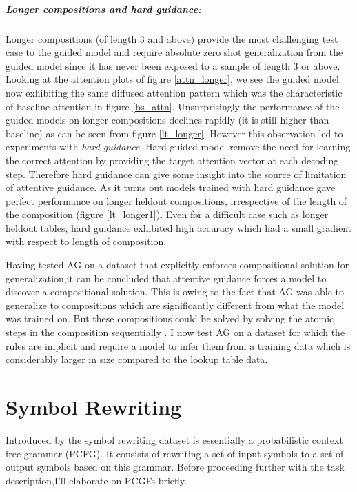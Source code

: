 \subparagraph{Longer compositions and hard guidance:} Longer compositions (of length 3 and above) provide the most challenging test case to the guided model and require absolute zero shot generalization from the guided model since it has never been exposed to a sample of length 3 or above. Looking at the attention plots of figure \ref{attn_longer}, we see the guided model now exhibiting the same diffused attention pattern which was the characteristic of baseline attention in figure \ref{bs_attn}. Unsurprisingly the performance of the guided models on longer compositions declines rapidly (it is still higher than baseline) as can be seen from figure \ref{lt_longer}.
However this observation led to experiments with \textit{hard guidance}. Hard guided model remove the need for learning the correct attention by providing the target attention vector at each decoding step. Therefore hard guidance can give some insight into the source of limitation of attentive guidance. As it turns out models trained with hard guidance gave perfect performance on longer heldout compositions, irrespective of the length of the composition (figure \ref{lt_longer1}). Even for a difficult case such as longer heldout tables, hard guidance exhibited high accuracy which had a small gradient with respect to length of composition.

Having tested AG on a dataset that explicitly enforces compositional solution for generalization,it can be concluded that attentive guidance forces a model to discover a compositional solution. This is owing to the fact that AG was able to generalize to compositions which are significantly different from what the model was trained on. But these compositions could be solved by solving the atomic steps in the composition sequentially . I now test AG on a dataset for which the rules are implicit and require a model to infer them from a training data which is considerably larger in size compared to the lookup table data. 



\section{Symbol Rewriting} \label{datasets:sr}
Introduced by \cite{Weber2018} the symbol rewriting dataset is essentially a probabilistic context free grammar (PCFG). It consists of rewriting a set of input symbols to a set of output symbols based on this grammar. Before proceeding further with the task description,I'll elaborate on PCGFs briefly.

